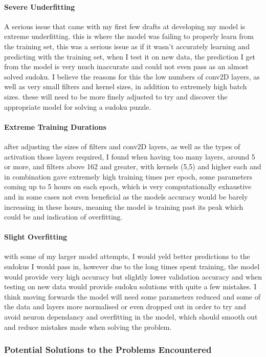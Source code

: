 \documentclass[]{final_report}
\begin{document}
\paragraph{Severe Underfitting}
A serious issue that came with my first few drafts at developing my model is extreme underfitting. this is where the model was failing to properly learn from the training set, this was a serious issue as if it wasn't accurately learning and predicting with the training set, when I test it on new data, the prediction I get from the model is very much inaccurate and could not even pass as an almost solved sudoku. I believe the reasons for this the low numbers of conv2D layers, as well as very small filters and kernel sizes, in addition to extremely high batch sizes. these will need to be more finely adjusted to try and discover the appropriate model for solving a sudoku puzzle.

\paragraph{Extreme Training Durations}
after adjusting the sizes of filters and conv2D layers, as well as the types of activation those layers required, I found when having too many layers, around 5 or more, and filters above 162 and greater, with kernels (5,5) and higher each and in combination gave extremely high training times per epoch, some parameters coming up to 5 hours on each epoch, which is very computationally exhaustive and in some cases not even beneficial as the models accuracy would be barely increasing in these hours, meaning the model is training past its peak which could be and indication of overfitting. 

\paragraph{Slight Overfitting}
with some of my larger model attempts, I would yeld better predictions to the sudokus I would pass in, however due to the long times spent training, the model would provide very high accuracy but slightly lower validation accuracy and when testing on new data would provide sudoku solutions with quite a few mistakes. I think moving forwards the model will need some parameters reduced and some of the data and layers more normalised or even dropped out in order to try and avoid neuron dependancy and overfitting in the model, which should smooth out and reduce mistakes made when solving the problem.

\subsubsection{Potential Solutions to the Problems Encountered}
\end{document}
